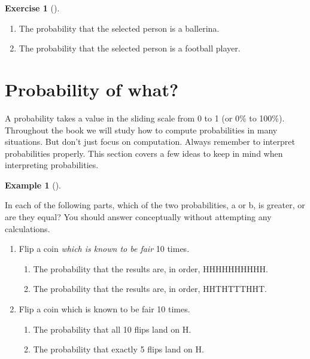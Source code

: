 \documentclass[
  letterpaper,
  DIV=11,
  numbers=noendperiod]{scrreprt}
\providecommand{\tightlist}{%
  \setlength{\itemsep}{0pt}\setlength{\parskip}{0pt}}
\theoremstyle{plain}
\theoremstyle{definition}
\newtheorem{example}{Example}[chapter]
\theoremstyle{definition}
\newtheorem{exercise}{Exercise}[chapter]
\theoremstyle{definition}
\theoremstyle{remark}
\begin{document}
\begin{exercise}[]
\begin{enumerate}
  \begin{enumerate}
  \def\labelenumii{\alph{enumii}.}
  \tightlist
  \item
    The probability that the selected person is a ballerina.
  \item
    The probability that the selected person is a football player.
  \end{enumerate}
\end{enumerate}

\end{exercise}

\section{Probability of what?}\label{sec-probofwhat}

A probability takes a value in the sliding scale from 0 to 1 (or 0\% to
100\%). Throughout the book we will study how to compute probabilities
in many situations. But don't just focus on computation. Always remember
to interpret probabilities properly. This section covers a few ideas to
keep in mind when interpreting probabilities.

\begin{tcolorbox}[enhanced jigsaw, opacityback=0, left=2mm, colframe=quarto-callout-note-color-frame, toprule=.15mm, breakable, colback=white, leftrule=.75mm, arc=.35mm, rightrule=.15mm, bottomrule=.15mm]

\begin{example}[]\protect\hypertarget{exm-probability-interpret1}{}\label{exm-probability-interpret1}

In each of the following parts, which of the two probabilities, a or b,
is greater, or are they equal? You should answer conceptually without
attempting any calculations.

\begin{enumerate}
\def\labelenumi{\arabic{enumi}.}
\item
  Flip a coin \emph{which is known to be fair} 10 times.

  \begin{enumerate}
  \def\labelenumii{\alph{enumii}.}
  \tightlist
  \item
    The probability that the results are, in order, HHHHHHHHHH.
  \item
    The probability that the results are, in order, HHTHTTTHHT.
  \end{enumerate}
\item
  Flip a coin which is known to be fair 10 times.

  \begin{enumerate}
  \def\labelenumii{\alph{enumii}.}
  \tightlist
  \item
    The probability that all 10 flips land on H.
  \item
    The probability that exactly 5 flips land on H.
  \end{enumerate}
\end{enumerate}

\end{example}

\end{tcolorbox}
\end{document}
